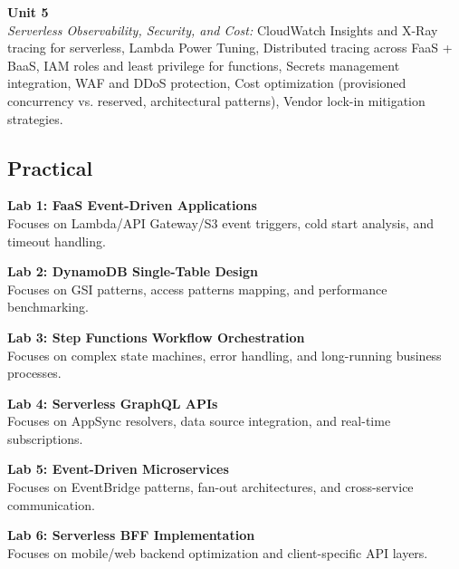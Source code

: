 \vspace{0.3cm}

\noindent\textbf{Unit 5} \\
\textit{Serverless Observability, Security, and Cost:} CloudWatch Insights and X-Ray tracing for serverless, Lambda Power Tuning, Distributed tracing across FaaS + BaaS, IAM roles and least privilege for functions, Secrets management integration, WAF and DDoS protection, Cost optimization (provisioned concurrency vs. reserved, architectural patterns), Vendor lock-in mitigation strategies.

\newpage

\subsection*{Practical}
\noindent\textbf{Lab 1: FaaS Event-Driven Applications} \\
Focuses on Lambda/API Gateway/S3 event triggers, cold start analysis, and timeout handling.

\vspace{0.2cm}

\noindent\textbf{Lab 2: DynamoDB Single-Table Design} \\
Focuses on GSI patterns, access patterns mapping, and performance benchmarking.

\vspace{0.2cm}

\noindent\textbf{Lab 3: Step Functions Workflow Orchestration} \\
Focuses on complex state machines, error handling, and long-running business processes.

\vspace{0.2cm}

\noindent\textbf{Lab 4: Serverless GraphQL APIs} \\
Focuses on AppSync resolvers, data source integration, and real-time subscriptions.

\vspace{0.2cm}

\noindent\textbf{Lab 5: Event-Driven Microservices} \\
Focuses on EventBridge patterns, fan-out architectures, and cross-service communication.

\vspace{0.2cm}

\noindent\textbf{Lab 6: Serverless BFF Implementation} \\
Focuses on mobile/web backend optimization and client-specific API layers.

